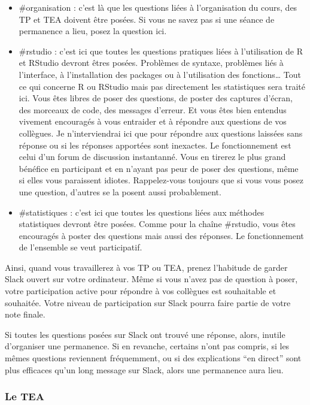 \documentclass[
  a4paper,
]{article}
\providecommand{\tightlist}{%
  \setlength{\itemsep}{0pt}\setlength{\parskip}{0pt}}
\begin{document}
\begin{itemize}
\tightlist
\item
  \#organisation : c'est là que les questions liées à l'organisation du cours, des TP et TEA doivent être posées. Si vous ne savez pas si une séance de permanence a lieu, posez la question ici.
\item
  \#rstudio : c'est ici que toutes les questions pratiques liées à l'utilisation de R et RStudio devront êtres posées. Problèmes de syntaxe, problèmes liés à l'interface, à l'installation des packages ou à l'utilisation des fonctions\ldots{} Tout ce qui concerne R ou RStudio mais pas directement les statistiques sera traité ici. Vous êtes libres de poser des questions, de poster des captures d'écran, des morceaux de code, des messages d'erreur. Et vous êtes bien entendus vivement encouragés à vous entraider et à répondre aux questions de vos collègues. Je n'interviendrai ici que pour répondre aux questions laissées sans réponse ou si les réponses apportées sont inexactes. Le fonctionnement est celui d'un forum de discussion instantanné. Vous en tirerez le plus grand bénéfice en participant et en n'ayant pas peur de poser des questions, même si elles vous paraissent idiotes. Rappelez-vous toujours que si vous vous posez une question, d'autres se la posent aussi probablement.
\item
  \#statistiques : c'est ici que toutes les questions liées aux méthodes statistiques devront être posées. Comme pour la chaîne \#rstudio, vous êtes encouragés à poster des questions mais aussi des réponses. Le fonctionnement de l'ensemble se veut participatif.
\end{itemize}

Ainsi, quand vous travaillerez à vos TP ou TEA, prenez l'habitude de garder Slack ouvert sur votre ordinateur. Même si vous n'avez pas de question à poser, votre participation active pour répondre à vos collègues est souhaitable et souhaitée. Votre niveau de participation sur Slack pourra faire partie de votre note finale.

Si toutes les questions posées sur Slack ont trouvé une réponse, alors, inutile d'organiser une permanence. Si en revanche, certains n'ont pas compris, si les mêmes questions reviennent fréquemment, ou si des explications ``en direct'' sont plus efficaces qu'un long message sur Slack, alors une permanence aura lieu.

\hypertarget{le-tea}{%
\subsubsection{Le TEA}\label{le-tea}}
\end{document}
